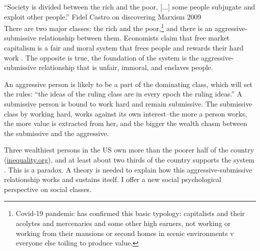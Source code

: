 \documentclass[11pt, letterpaper]{article}
\begin{document}
\hspace{.2in}

\begin{spacing}{2.0} %

\newpage

``Society is divided between the rich and the poor, [...] some people subjugate and exploit other people.'' Fidel Castro on discovering Marxism 2009\\




There are two major classes: the rich and the poor,\footnote{Covid-19 pandemic
  has confirmed this basic typology: capitalists and their acolytes and mercenaries and some other high earners, not working or working from their mansions or second homes in scenic environments v everyone else toiling to produce value.} and there is an
aggressive-submissive relationship between them. %
Economists claim that free market capitalism is a fair and moral system that frees people and rewards their hard work  \citep{smith76,glaeser11B}.
 The opposite is true, the foundation of the system is the aggressive-submissive
relationship that is unfair, immoral, and enslaves people. %


An aggressive person is likely to be a part of  the dominating class, which will set the
rules: ``the ideas of the ruling class are in every epoch the ruling ideas.'' \citep{marx65}
A submissive person is bound to work hard and remain submissive.
The submissive class by working hard, works against its own interest--the more a
person works, the more value is extracted from her, and the bigger the wealth chasm
between the submissive and the aggressive. %

Three wealthiest persons in the US own more than the poorer
half of the country (\url{inequality.org}), and at least about two thirds of the country
supports the system \citep{pew19capitalism}. 
 This is a paradox. A theory is needed to explain how this aggressive-submissive
relationship works and sustains itself. I offer a new social psychological %
perspective on social classes. %


\end{spacing}
\end{document}
